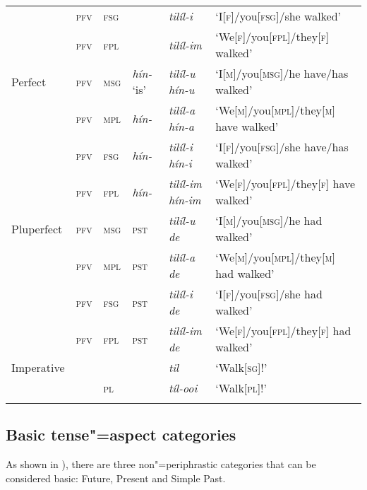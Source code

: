 \begin{sidewaystable}[p!]
\begin{tabularx}{\textwidth}{ l l l l l l }
&
\textsc{pfv} &
\textsc{fsg} &
&
\textit{tilíl-i} &
`I[\textsc{f}]/you[\textsc{fsg}]/she walked' \\
&
\textsc{pfv} &
\textsc{fpl} &
&
\textit{tilíl-im} &
`We[\textsc{f}]/you[\textsc{fpl}]/they[\textsc{f}] walked' \\
Perfect &
\textsc{pfv} &
\textsc{msg} &
\textit{hín-} `is' &
\textit{tilíl-u hín-u} &
`I[\textsc{m}]/you[\textsc{msg}]/he have/has walked' \\
&
\textsc{pfv} &
\textsc{mpl} &
\textit{hín-} &
\textit{tilíl-a hín-a} &
`We[\textsc{m}]/you[\textsc{mpl}]/they[\textsc{m}] have walked' \\
&
\textsc{pfv} &
\textsc{fsg} &
\textit{hín-} &
\textit{tilíl-i hín-i} &
`I[\textsc{f}]/you[\textsc{fsg}]/she have/has walked' \\
&
\textsc{pfv} &
\textsc{fpl} &
\textit{hín-} &
\textit{tilíl-im hín-im} &
`We[\textsc{f}]/you[\textsc{fpl}]/they[\textsc{f}] have walked' \\
Pluperfect &
\textsc{pfv} &
\textsc{msg} &
\textsc{pst} &
\textit{tilíl-u de} &
`I[\textsc{m}]/you[\textsc{msg}]/he had walked' \\
&
\textsc{pfv} &
\textsc{mpl} &
\textsc{pst} &
\textit{tilíl-a de} &
`We[\textsc{m}]/you[\textsc{mpl}]/they[\textsc{m}] had walked' \\
&
\textsc{pfv} &
\textsc{fsg} &
\textsc{pst} &
\textit{tilíl-i de} &
`I[\textsc{f}]/you[\textsc{fsg}]/she had walked' \\
&
\textsc{pfv} &
\textsc{fpl} &
\textsc{pst} &
\textit{tilíl-im de} &
`We[\textsc{f}]/you[\textsc{fpl}]/they[\textsc{f}] had walked' \\
Imperative &
&
&
&
\textit{til} &
`Walk[\textsc{sg}]!' \\
&
&
\textsc{pl} &
&
\textit{tíl-ooi} &
`Walk[\textsc{pl}]!' 
\\\lspbottomrule
\end{tabularx}
\label{tab:9-1b}
\end{sidewaystable}


\subsection{Basic tense"=aspect categories}
\label{subsec:9-1-1}


As shown in ), there are three non"=periphrastic categories that can be considered basic: Future, Present and Simple Past.


